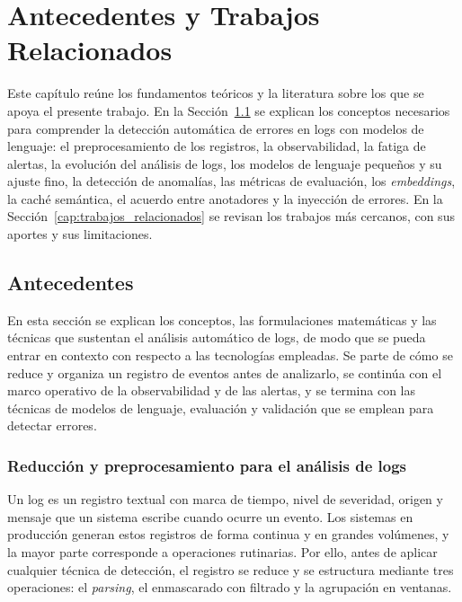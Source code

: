 \chapter{Antecedentes y Trabajos Relacionados} \label{cap:antecedentes}

Este capítulo reúne los fundamentos teóricos y la literatura sobre los que se apoya el presente trabajo. En la Sección~\ref{sec:antecedentes} se explican los conceptos necesarios para comprender la detección automática de errores en logs con modelos de lenguaje: el preprocesamiento de los registros, la observabilidad, la fatiga de alertas, la evolución del análisis de logs, los modelos de lenguaje pequeños y su ajuste fino, la detección de anomalías, las métricas de evaluación, los \textit{embeddings}, la caché semántica, el acuerdo entre anotadores y la inyección de errores. En la Sección~\ref{cap:trabajos_relacionados} se revisan los trabajos más cercanos, con sus aportes y sus limitaciones.

\section{Antecedentes}\label{sec:antecedentes}

En esta sección se explican los conceptos, las formulaciones matemáticas y las técnicas que sustentan el análisis automático de logs, de modo que se pueda entrar en contexto con respecto a las tecnologías empleadas. Se parte de cómo se reduce y organiza un registro de eventos antes de analizarlo, se continúa con el marco operativo de la observabilidad y de las alertas, y se termina con las técnicas de modelos de lenguaje, evaluación y validación que se emplean para detectar errores.

\subsection{Reducción y preprocesamiento para el análisis de logs}\label{sec:ant_preprocesamiento}

Un log es un registro textual con marca de tiempo, nivel de severidad, origen y mensaje que un sistema escribe cuando ocurre un evento. Los sistemas en producción generan estos registros de forma continua y en grandes volúmenes, y la mayor parte corresponde a operaciones rutinarias. Por ello, antes de aplicar cualquier técnica de detección, el registro se reduce y se estructura mediante tres operaciones: el \textit{parsing}, el enmascarado con filtrado y la agrupación en ventanas.

